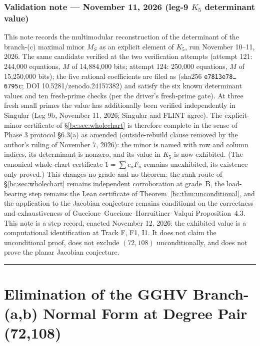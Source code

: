 \documentclass[a4paper,11pt]{article}
\newcommand{\filename}[1]{\texttt{\seqsplit{#1}}}
\theoremstyle{plain}
\theoremstyle{definition}
\theoremstyle{remark}
\begin{document}
\section*{Validation note --- November 11, 2026 (leg-9 $K_5$ determinant value)}
This note records the multimodular reconstruction of the determinant of the branch-(c) maximal minor $M_S$ as an explicit element of $K_5$, run November 10--11, 2026. The same candidate verified at the two verification attempts (attempt 121: 244,000 equations, $M$ of 14,884,000 bits; attempt 124: 250,000 equations, $M$ of 15,250,000 bits); the five rational coefficients are filed as \filename{gghv-dependency-closure/leg9/result.json} (sha256 \texttt{e7813e78\ldots 6795c}; DOI 10.5281/zenodo.24157382) and satisfy the six known determinant values and ten fresh-prime checks (per the driver's fresh-prime gate). At three fresh small primes the value has additionally been verified independently in Singular (Leg 9b, November 11, 2026; Singular and FLINT agree). The explicit-minor certificate of \S\ref{bc:sec:wholechart} is therefore complete in the sense of Phase 3 protocol \S6.3(a) as amended (outside-rebuild clause removed by the author's ruling of November 7, 2026): the minor is named with row and column indices, its determinant is nonzero, and its value in $K_5$ is now exhibited. (The canonical whole-chart certificate $1=\sum c_nF_n$ remains unexhibited, its existence only proved.) This changes no grade and no theorem: the rank route of \S\ref{bc:sec:wholechart} remains independent corroboration at grade~B, the load-bearing step remains the Lean certificate of Theorem~\ref{bc:thm:unconditional}, and the application to the Jacobian conjecture remains conditional on the correctness and exhaustiveness of Guccione--Guccione--Horruitiner--Valqui Proposition~4.3. This note is a step record, enacted November 12, 2026: the exhibited value is a computational identification at Track F, F1, I1. It does not claim the unconditional proof, does not exclude $(72,108)$ unconditionally, and does not prove the planar Jacobian conjecture.



\vspace{1.2cm}
\hrule
\vspace{1.4cm}

\tableofcontents
\newpage

\part{\texorpdfstring{Elimination of the GGHV Branch-(a,b) Normal Form at Degree Pair (72,108)}{Elimination of the GGHV Branch-(a,b) Normal Form at Degree Pair (72,108)}}
\end{document}
